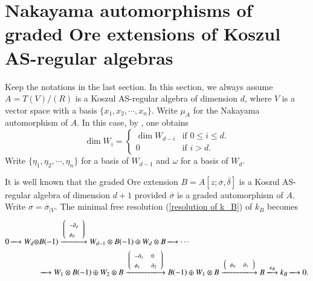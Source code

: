 \documentclass[a4paper,10pt]{amsart}
\theoremstyle{definition}
\numberwithin{equation}{section}
\begin{document}
\section{Nakayama automorphisms of graded Ore extensions of Koszul AS-regular algebras}
Keep the notations in the last section. In this section, we always assume $A=T(V)/(R)$ is a Koszul AS-regular algebra of dimension $d$, where $V$ is a vector space with a basis $\{x_1,x_2,\cdots,x_n\}$. Write $\mu_A$ for the Nakayama automorphism of $A$. In this case, by \cite[Proposition 3.1.4]{SZ}, one obtains
$$
\dim W_i=
\left\{
\begin{array}{ll}
\dim W_{d-i} & \text{if } 0\leq i\leq d.\\
0            & \text{if } i>d.
\end{array}
\right.
$$
Write $\{\eta_1,\eta_2,\cdots,\eta_n\}$ for a basis of $W_{d-1}$ and  $\omega$ for a basis of $W_d$.


It is well known that the graded Ore extension $B=A[z;\overline{\sigma},\overline{\delta}]$ is a Koszul AS-regular algebra of dimension $d+1$ provided $\overline{\sigma}$ is a graded automorphism of $A$. Write $\sigma=\overline{\sigma}_{\mid V}$. The minimal free resolution (\ref{resolution of k_B}) of $k_B$ becomes
\begin{equation}\label{resolution of koszul regular}
\begin{aligned}
0\xlongrightarrow{}
W_{d}\otimes& B(-1)
\xlongrightarrow{\left({\scriptscriptstyle\begin{array}{ll}{\scriptstyle -\partial_{d} }\\ {\scriptstyle\phi_{d} }\end{array}}\right)}
W_{d-1}\otimes B(-1)\oplus W_d\otimes B\xlongrightarrow{}\cdots\\
&\xlongrightarrow{}
W_1\otimes B(-1)\oplus W_{2}\otimes B \xlongrightarrow{\left({\scriptscriptstyle\begin{array}{ll}{\scriptstyle -\partial_{1} }& {\scriptstyle0} \\ {\scriptstyle\phi_1 }&{\scriptstyle \partial_{2}}\end{array}}\right)}
B(-1)\oplus W_1\otimes B\xlongrightarrow{\left(\begin{array}{ll}{\scriptstyle \phi_0}& {\scriptstyle \partial_1}\end{array}\right)}
B\xlongrightarrow{\varepsilon_B}
k_B\xlongrightarrow{} 0.
\end{aligned}
\end{equation}
\end{document}
